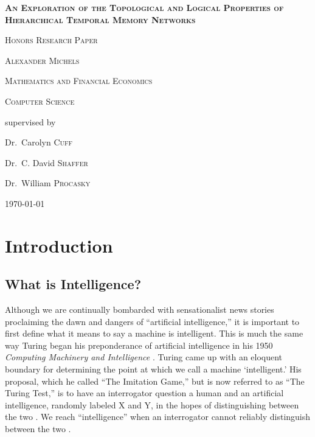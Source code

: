 \documentclass[fleqn,minimal]{article}
\newcommand\blankpage{
	\pagebreak
	\ifthispageodd{\null
		\vfill
		\vfill
		\thispagestyle{empty}
		\clearpage}{}
}
\begin{document}
	\begin{titlepage}
		\centering
		{\scshape\LARGE \textbf{An Exploration of the Topological and Logical Properties of Hierarchical Temporal Memory Networks} \par}
		{\scshape\LARGE Honors Research Paper \par}
		\vspace{1cm}
		{\scshape\Large Alexander Michels\par}
		\vspace{0.5cm}
		{\scshape\Large Mathematics and Financial Economics\par}
		\vspace{0.5cm}
		{\scshape\Large Computer Science\par}
		\vspace{1cm}
		\vfill \large
		supervised by\par
		Dr.~Carolyn \textsc{Cuff}\par
		Dr.~C. David \textsc{Shaffer}\par
		Dr.~William \textsc{Procasky}\par
		
		\vfill
		
		{\large \today\par}
	\end{titlepage}
	
	\blankpage
	\tableofcontents
	
	\blankpage
	\listoffigures
	
	\blankpage
	
	\section{Introduction}
	
	\subsection{What is Intelligence?}
	
	Although we are continually bombarded with sensationalist news stories proclaiming the dawn and dangers of ``artificial intelligence,'' it is important to first define what it means to say a machine is intelligent. This is much the same way Turing began his preponderance of artificial intelligence in his 1950 \textit{Computing Machinery and Intelligence} \cite{Turing}. Turing came up with an eloquent boundary for determining the point at which we call a machine `intelligent.' His proposal, which he called ``The Imitation Game,'' but is now referred to as ``The Turing Test,'' is to have an interrogator question a human and an artificial intelligence, randomly labeled X and Y, in the hopes of distinguishing between the two \cite{Turing}. We reach ``intelligence'' when an interrogator cannot reliably distinguish between the two \cite{Turing}.
	
\end{document}
